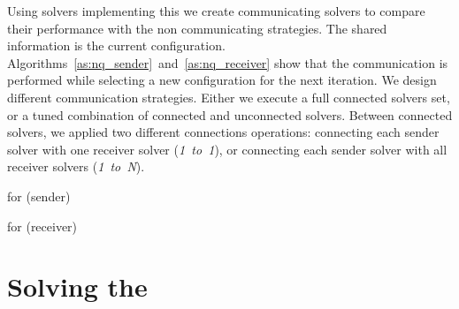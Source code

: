 Using solvers implementing this \as{} we create communicating solvers to compare their performance with the non communicating strategies. The shared information is the current configuration. Algorithms~\ref{as:nq_sender}~and~\ref{as:nq_receiver} show that the communication is performed while selecting a new configuration for the next iteration. We design different communication strategies. Either we execute a full connected solvers set, or a tuned combination of connected and unconnected solvers. Between connected solvers, we applied two different connections operations: connecting each sender solver with one receiver solver ({\it 1~to~1}), or connecting each sender solver with all receiver solvers ({\it 1~to~N}).

\begin{algorithm}[H]
\dontprintsemicolon
\SetNoline
{}
\caption{\As{} for \NQP{} (sender)}\label{as:nq_sender}
\end{algorithm}

\begin{algorithm}[H]
\dontprintsemicolon
\SetNoline
{}
\caption{\As{} for \NQP{} (receiver)}\label{as:nq_receiver}
\end{algorithm}


\section{Solving the \carrp}

